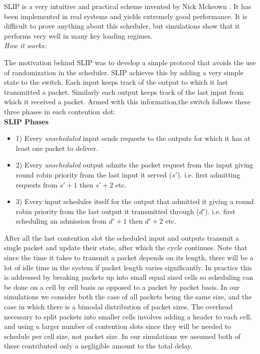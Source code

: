 \documentclass{IEEEtran}%
\begin{document}
SLIP is a very intuitive and practical scheme invented by Nick Mckeown \cite{McKeown}.  It has been implemented in real systems and yields extremely good performance.  It is difficult to prove anything about this scheduler, but simulations show that it performs very well in many key loading regimes.\\

{\it How it works:}

The motivation behind SLIP was to develop a simple protocol that avoids the use of randomization in the scheduler.  SLIP achieves this by adding a very simple state to the switch.  Each input keeps track of the output to which it last transmitted a packet.  Similarly each output keeps track of the last input from which it received a packet.  Armed with this information,the switch follows these three phases in each contention slot:\\

{\bf SLIP Phases}
\begin{itemize}
\item 1) Every {\it unscheduled} input sends requests to the outputs for which it has at least one packet to deliver.
\item 2) Every {\it unscheduled} output admits the packet request from the input giving round robin priority from the last input it served ($s'$). i.e. first admitting requests from $s'+1$ then $s'+2$ etc.
\item 3) Every input schedules itself for the output that admitted it giving a round robin priority from the last output it transmitted through ($d'$).  i.e. first scheduling an admission from $d'+1$ then $d'+2$ etc.\\
\end{itemize}

After all the last contention slot the scheduled input and outputs transmit a single packet and update their state, after which the cycle continues.  Note that since the time it takes to transmit a packet depends on its length, there will be a lot of idle time in the system if packet length varies significantly.  In practice this is addressed by breaking packets up into small equal sized cells so scheduling can be done on a cell by cell basis as opposed to a packet by packet basis.  In our simulations we consider both the case of all packets being the same size, and the case in which there is a bimodal distribution of packet sizes.  The overhead necessary to split packets into smaller cells involves adding a header to each cell, and using a larger number of contention slots since they will be needed to schedule per cell size, not packet size.  In our simulations we assumed both of these contributed only a negligible amount to the total delay.
\end{document}
